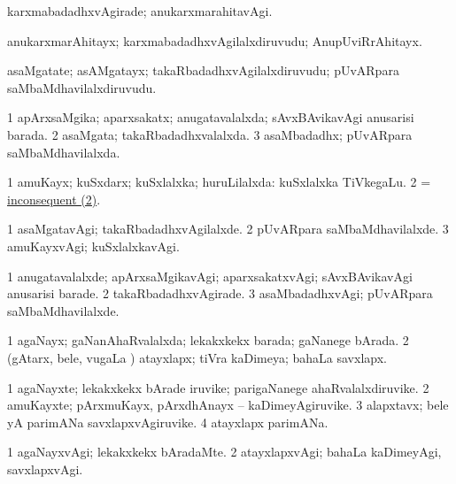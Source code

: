 \bentry
{}
\gl{\kirxvi}
\bmng
karxmabadadhxvAgirade; anukarxmarahitavAgi. 
\emng
\eentry

\bentry
{}
\gl{\nA}
\bmng
anukarxmarAhitayx; karxmabadadhxvAgilalxdiruvudu; AnupUviRrAhitayx. 
\emng
\eentry

\bentry
{}
\gl{\nA}
\bmng
asaMgatate; asAMgatayx; takaRbadadhxvAgilalxdiruvudu; pUvARpara saMbaMdhavilalxdiruvudu. 
\emng
\eentry

\bentry
{}
\gl{\gu}
\bmng
\bnum
\num{1} apArxsaMgika; aparxsakatx; anugatavalalxda; sAvxBAvikavAgi anusarisi barada. 
\hypertarget{inconsequent(2)}{} 
\num{2} asaMgata; takaRbadadhxvalalxda. 
\num{3} asaMbadadhx; pUvARpara saMbaMdhavilalxda. 
\enum
\emng
\eentry

\bentry
{}
\gl{\gu}
\bmng
\bnum
\num{1} amuKayx; kuSxdarx; kuSxlalxka; huruLilalxda:  kuSxlalxka TiVkegaLu. 
\num{2}  = \hyperlink{inconsequent(2)}{inconsequent (2)}. 
\enum
\emng
\eentry

\bentry
{}
\gl{\kirxvi}
\bmng
\bnum
\num{1} asaMgatavAgi; takaRbadadhxvAgilalxde. 
\num{2} pUvARpara saMbaMdhavilalxde. 
\num{3} amuKayxvAgi; kuSxlalxkavAgi. 
\enum
\emng
\eentry

\bentry
{}
\gl{\kirxvi}
\bmng
\bnum
\num{1} anugatavalalxde; apArxsaMgikavAgi; aparxsakatxvAgi; sAvxBAvikavAgi anusarisi barade. 
\num{2} takaRbadadhxvAgirade. 
\num{3} asaMbadadhxvAgi; pUvARpara saMbaMdhavilalxde. 
\enum
\emng
\eentry

\bentry
{}
\gl{\gu}
\bmng
\bnum
\num{1} agaNayx; gaNanAhaRvalalxda; lekakxkekx barada; gaNanege bArada. 
\num{2} (gAtarx, bele, \mo vugaLa \vi) atayxlapx; tiVra kaDimeya; bahaLa savxlapx. 
\enum
\emng
\eentry

\bentry
{}
\gl{\nA}
\bmng
\bnum
\num{1} agaNayxte; lekakxkekx bArade iruvike; parigaNanege ahaRvalalxdiruvike. 
\num{2} amuKayxte; pArxmuKayx, pArxdhAnayx -- kaDimeyAgiruvike. 
\num{3} alapxtavx; bele yA parimANa savxlapxvAgiruvike. 
\num{4} atayxlapx parimANa. 
\enum
\emng
\eentry

\bentry
{}
\gl{\kirxvi}
\bmng
\bnum
\num{1} agaNayxvAgi; lekakxkekx bAradaMte. 
\num{2} atayxlapxvAgi; bahaLa kaDimeyAgi, savxlapxvAgi. 
\enum
\emng
\eentry

